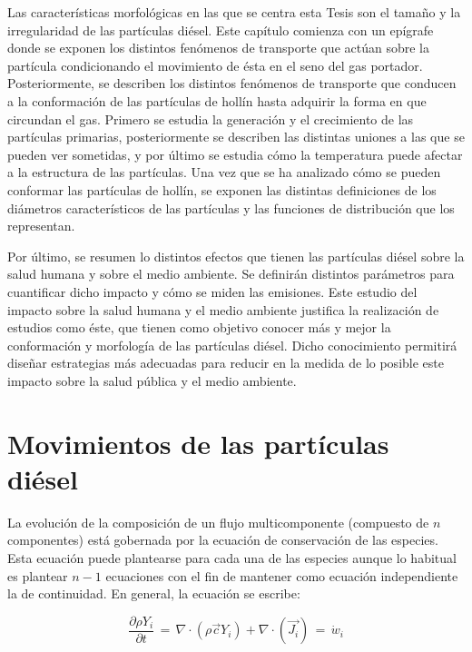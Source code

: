 \par Las características morfológicas en las que se centra esta Tesis son el tamaño y la irregularidad de las partículas diésel. Este capítulo comienza con un epígrafe donde se exponen los distintos fenómenos de transporte que actúan sobre la partícula condicionando el movimiento de ésta en el seno del gas portador. Posteriormente, se describen los distintos fenómenos de transporte que conducen a la conformación de las partículas de hollín hasta adquirir la forma en que circundan el gas. Primero se estudia la generación y el crecimiento de las partículas primarias, posteriormente se describen las distintas uniones a las que se pueden ver sometidas, y por último se estudia cómo la temperatura puede afectar a la estructura de las partículas. Una vez que se ha analizado cómo se pueden conformar las partículas de hollín, se exponen las distintas definiciones de los diámetros característicos de las partículas y las funciones de distribución que los representan.

\par Por último, se resumen lo distintos efectos que tienen las partículas diésel sobre la salud humana y sobre el medio ambiente. Se definirán distintos parámetros para cuantificar dicho impacto y cómo se miden las emisiones. Este estudio del impacto sobre la salud humana y el medio ambiente justifica la realización de estudios como éste, que tienen como objetivo conocer más y mejor la conformación y morfología de las partículas diésel. Dicho conocimiento permitirá diseñar estrategias más adecuadas para reducir en la medida de lo posible este impacto sobre la salud pública y el medio ambiente.

\section{Movimientos de las partículas diésel}\label{sec:Movimientos}

\par La evolución de la composición de un flujo  multicomponente (compuesto de $n$ componentes) está gobernada por la ecuación de  conservación de las especies. Esta ecuación puede plantearse para cada una de las especies aunque lo habitual es plantear $n-1$ ecuaciones con el fin de mantener como ecuación independiente la de continuidad. En general, la ecuación se escribe:

\begin{equation}
\label{ec:continuidad}
\frac{\partial \rho Y_i}{\partial t}\,=\, \nabla \cdot (\rho \vec{c} Y_i)+ \nabla \cdot (\vec{J_i})\,=\, \dot{w}_i
\end{equation}

